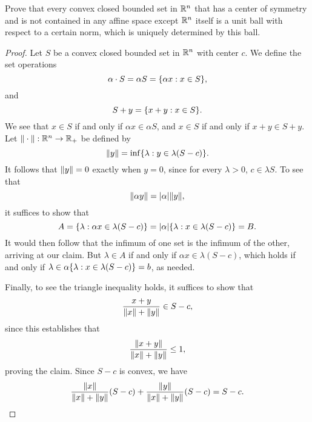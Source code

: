 \begin{minorEx}
    Prove that every convex closed bounded set in $\mathbb{R}^n$ that has a center of
    symmetry and is not contained in any affine space except $\mathbb{R}^n$ itself is a
    unit ball with respect to a certain norm, which is uniquely determined by
    this ball.
\end{minorEx}

\begin{proof}
    Let $S$ be a convex closed bounded set in $\mathbb{R}^n$ with center $c$. We define
    the set operations
    \[
        \alpha \cdot S = \alpha S = \{\alpha x : x \in S\},
    \]
    and
    \[
        S + y = \{x + y : x \in S\}.
    \]
    We see that $x \in S$ if and only if $\alpha x \in \alpha S$, and $x \in S$
    if and only if $x + y \in S + y$. Let $\Vert\cdot\Vert : \mathbb{R}^n
    \to \mathbb{R}_{+}$ be defined by
    \[
        \Vert y\Vert = \inf \{\lambda : y \in \lambda (S - c)\}.
    \]
    It follows that $\Vert y\Vert = 0$ exactly when $y = 0$, since for every
    $\lambda > 0$, $c \in \lambda S$. To see that
    \[
        \Vert\alpha y\Vert = |\alpha| \Vert y\Vert,
    \]
    it suffices to show that 
    \[
        A = \{\lambda : \alpha x \in \lambda (S - c)\} =
        |\alpha| \{\lambda : x \in \lambda (S - c)\} = B.
    \]
    It would then follow that the infimum of one set is the infimum of the
    other, arriving at our claim. But $\lambda \in A$ if and only if $\alpha x \in
    \lambda(S - c)$, which holds if and only if $\lambda \in \alpha \{\lambda
        : x \in \lambda (S - c)\} = b$, as needed.

    Finally, to see the triangle inequality holds, it suffices to show that 
    \[
        \frac{x + y}{\Vert x\Vert + \Vert y\Vert} \in S - c,
    \]
    since this establishes that
    \[
        \frac{\Vert x + y\Vert}{\Vert x\Vert + \Vert y\Vert} \leq 1,
    \]
    proving the claim. Since $S-c$ is convex, we have
    \[
        \frac{\Vert x\Vert}{\Vert x\Vert + \Vert y\Vert} (S - c) + 
        \frac{\Vert y\Vert}{\Vert x\Vert + \Vert y\Vert} (S - c) = 
        S - c.
    \]
\end{proof}
